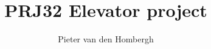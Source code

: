\documentclass[a4paper,11pt,twoside,british]{report}
\title{PRJ32 Elevator project}
\author{Pieter van den Hombergh}
\begin{document}

\setpagewiselinenumbers
\modulolinenumbers[5]
\linenumbers

\pagestyle{fancy}
\tableofcontents
\cleardoublepage
\listoffigures
\lstlistoflistings
\cleardoublepage
{}
\providecommand\sourceroot{../40_sources/sevenloio/sevenlowarrior/}







\end{document}
